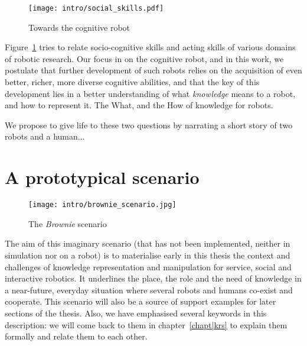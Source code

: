 \begin{figure}
    \centering
    \texttt{[image: intro/social\_skills.pdf]}
    \caption{Towards the cognitive robot}
    \label{fig|cognitive-robots}
\end{figure}

Figure~\ref{fig|cognitive-robots} tries to relate socio-cognitive skills and
acting skills of various domains of robotic research. Our focus in on the
cognitive robot, and in this work, we postulate that further development of
such robots relies on the acquisition of even better, richer, more diverse
cognitive abilities, and that the key of this development lies in a better
understanding of what \emph{knowledge} means to a robot, and how to represent
it. The What, and the How of knowledge for robots.

% 
% 
% 

We propose to give life to these two questions by narrating a short story of
two robots and a human...


\section{A prototypical scenario}
\label{sect|scenario}

\begin{figure*}
	\centering
	\texttt{[image: intro/brownie\_scenario.jpg]}
	\caption{The {\em Brownie} scenario}
	\label{fig|scenario}
\end{figure*}

The aim of this imaginary scenario (that has not been implemented, neither in
simulation nor on a robot) is to materialise early in this thesis the context
and challenges of knowledge representation and manipulation for service, social
and interactive robotics. It underlines the place, the role and the need of
knowledge in a near-future, everyday situation where several robots and humans
co-exist and cooperate. This scenario will also be a source of support examples
for later sections of the thesis. Also, we have emphasised several keywords in
this description: we will come back to them in chapter~\ref{chapt|krs} to
explain them formally and relate them to each other.

